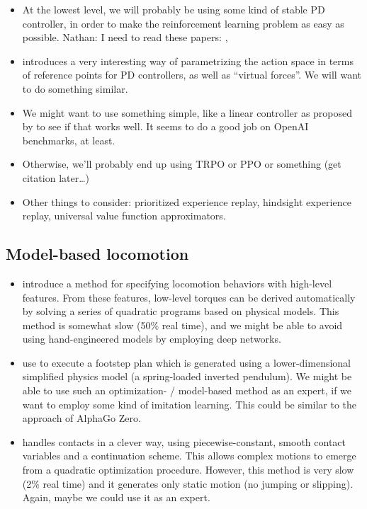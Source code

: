 \documentclass[a4paper]{article}
\newcommand{\nhatch}[1]{{\leavevmode\color{blue} Nathan: #1}}
\begin{document}
\begin{itemize}
  \item At the lowest level, we will probably be using some kind of stable PD controller, in order to make the reinforcement learning problem as easy as possible.
    \nhatch{I need to read these papers:} \cite{tan2011stable}, \cite{shrivastava2013stable}
  \item \cite{peng2015terrain} introduces a very interesting way of parametrizing the action space in terms of reference points for PD controllers, as well as ``virtual forces''.
    We will want to do something similar.
  \item We might want to use something simple, like a linear controller as proposed by \cite{mania2018simple} to see if that works well.
    It seems to do a good job on OpenAI benchmarks, at least.
  \item Otherwise, we'll probably end up using TRPO or PPO or something (get citation later\dots)
  \item Other things to consider: prioritized experience replay, hindsight experience replay, universal value function approximators.
\end{itemize}


\subsection*{Model-based locomotion}

\begin{itemize}
  \item \cite{de2010feature} introduce a method for specifying locomotion behaviors with high-level features.
    From these features, low-level torques can be derived automatically by solving a series of quadratic programs based on physical models.
    This method is somewhat slow (50\% real time), and we might be able to avoid using hand-engineered models by employing deep networks.

  \item \cite{mordatch2010robust} use \cite{de2010feature} to execute a footstep plan which is generated using a lower-dimensional simplified physics model (a spring-loaded inverted pendulum).
    We might be able to use such an optimization- / model-based method as an expert, if we want to employ some kind of imitation learning.
    This could be similar to the approach of AlphaGo Zero.

  \item \cite{mordatch2012discovery} handles contacts in a clever way, using piecewise-constant, smooth contact variables and a continuation scheme.
    This allows complex motions to emerge from a quadratic optimization procedure.
    However, this method is very slow (2\% real time) and it generates only static motion (no jumping or slipping).
    Again, maybe we could use it as an expert.

\end{itemize}
\end{document}
